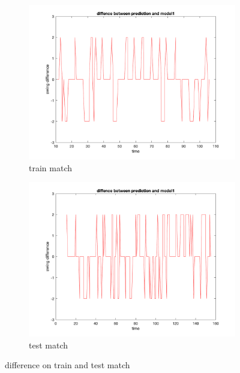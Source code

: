 \begin{figure}[H]
    \centering
    \begin{subfigure}[b]{0.5\textwidth}
        \includegraphics[width=\linewidth]{mainmatter/imgs/generalization_train.png}
        \caption{train match}
    \end{subfigure}\hspace{-0.02\textwidth}
    \begin{subfigure}[b]{0.5\textwidth}
        \includegraphics[width=\linewidth]{mainmatter/imgs/generalization_test.png}
        \caption{test match}
    \end{subfigure}\hspace{-0.02\textwidth}
    \caption{difference on train and test match}
    \label{fig:generalization}
\end{figure}

